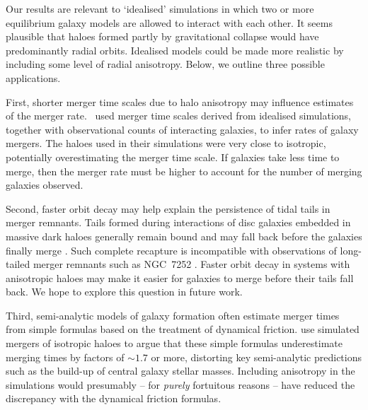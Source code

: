 \documentclass[fleqn,usenatbib]{mnras}
\begin{document}
Our results are relevant to `idealised' simulations in which two or more equilibrium galaxy models are allowed to interact with each other. It seems plausible that haloes formed partly by gravitational collapse would have predominantly radial orbits. Idealised models could be made more realistic by including some level of radial anisotropy. Below, we outline three possible applications.

First, shorter merger time scales due to halo anisotropy may influence estimates of the merger rate. \citet{Lotz}~used merger time scales derived from idealised simulations, together with observational counts of interacting galaxies, to infer rates of galaxy mergers. The haloes used in their simulations were very close to isotropic, potentially overestimating the merger time scale. If galaxies take less time to merge, then the merger rate must be higher to account for the number of merging galaxies observed.

Second, faster orbit decay may help explain the persistence of tidal tails in merger remnants. Tails formed during interactions of disc galaxies embedded in massive dark haloes generally remain bound and may fall back before the galaxies finally merge \citep[e.g.,][and references therein]{Barnes2016}. Such complete recapture is incompatible with observations of long-tailed merger remnants such as NGC~7252 \citep{Schweizer1982}. Faster orbit decay in systems with anisotropic haloes may make it easier for galaxies to merge before their tails fall back. We hope to explore this question in future work.

Third, semi-analytic models of galaxy formation often estimate merger times from simple formulas based on the \cite{Chandrasekhar1943} treatment of dynamical friction. \citet*{BKMQ2008} use simulated mergers of isotropic haloes to argue that these simple formulas underestimate merging times by factors of $\sim 1.7$ or more, distorting key semi-analytic predictions such as the build-up of central galaxy stellar masses. Including anisotropy in the simulations would presumably -- for \textit{purely} fortuitous reasons -- have reduced the discrepancy with the dynamical friction formulas.
\end{document}
